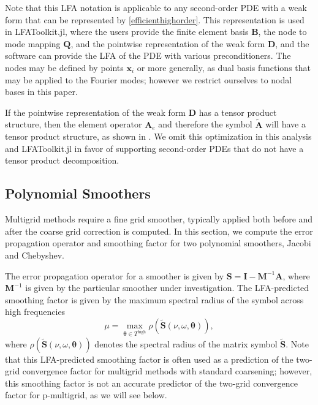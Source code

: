 \documentclass[review]{siamart190516}
\begin{document}
Note that this LFA notation is applicable to any second-order PDE with a weak form that can be represented by \cref{efficienthighorder}.
This representation is used in LFAToolkit.jl, where the users provide the finite element basis $\mathbf{B}$, the node to mode mapping $\mathbf{Q}$, and the pointwise representation of the weak form $\mathbf{D}$, and the software can provide the LFA of the PDE with various preconditioners.
The nodes may be defined by points $\mathbf x_i$ or more generally, as dual basis functions that may be applied to the Fourier modes; however we restrict ourselves to nodal bases in this paper.

If the pointwise representation of the weak form $\mathbf{D}$ has a tensor product structure, then the element operator $\mathbf{A}_e$ and therefore the symbol $\tilde{\mathbf{A}}$ will have a tensor product structure, as shown in \cite{he2020two}.
We omit this optimization in this analysis and LFAToolkit.jl in favor of supporting second-order PDEs that do not have a tensor product decomposition.

\subsection{Polynomial Smoothers}\label{sec:smooth}

Multigrid methods require a fine grid smoother, typically applied both before and after the coarse grid correction is computed.
In this section, we compute the error propagation operator and smoothing factor for two polynomial smoothers, Jacobi and Chebyshev.

The error propagation operator for a smoother is given by $\mathbf{S} = \mathbf{I} - \mathbf{M}^{-1} \mathbf{A}$, where $\mathbf{M}^{-1}$ is given by the particular smoother under investigation.
The LFA-predicted smoothing factor is given by the maximum spectral radius of the symbol across high frequencies
\begin{equation}
\mu = \max_{\boldsymbol{\theta} \in T^{\text{high}}} \rho \left( \tilde{\mathbf{S}} \left( \nu, \omega, \boldsymbol{\theta} \right) \right),
\end{equation}
where $ \rho \left( \tilde{\mathbf{S}} \left( \nu, \omega, \boldsymbol{\theta} \right)\right)$ denotes the spectral radius of the matrix symbol $\tilde{\mathbf{S}}$.
Note that this LFA-predicted smoothing factor is often used as a prediction of the two-grid convergence factor for multigrid methods with standard coarsening; however, this smoothing factor is not an accurate predictor of the two-grid convergence factor for p-multigrid, as we will see below.
\end{document}
